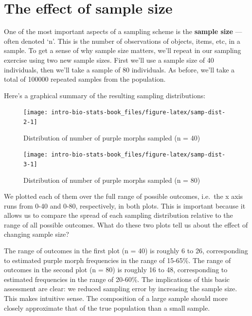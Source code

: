\documentclass[
]{book}
\begin{document}
\hypertarget{the-effect-of-sample-size}{%
\section{The effect of sample size}\label{the-effect-of-sample-size}}

One of the most important aspects of a sampling scheme is the \textbf{sample size} ---often denoted `n'. This is the number of observations of objects, items, etc, in a sample. To get a sense of why sample size matters, we'll repeat in our sampling exercise using two new sample sizes. First we'll use a sample size of 40 individuals, then we'll take a sample of 80 individuals. As before, we'll take a total of 100000 repeated samples from the population.

Here's a graphical summary of the resulting sampling distributions:

\begin{figure}

{\centering \texttt{[image: intro-bio-stats-book\_files/figure-latex/samp-dist-2-1]} 

}

\caption{Distribution of number of purple morphs sampled (n = 40)}\label{fig:samp-dist-2}
\end{figure}

\begin{figure}

{\centering \texttt{[image: intro-bio-stats-book\_files/figure-latex/samp-dist-3-1]} 

}

\caption{Distribution of number of purple morphs sampled (n = 80)}\label{fig:samp-dist-3}
\end{figure}

We plotted each of them over the full range of possible outcomes, i.e.~the x axis runs from 0-40 and 0-80, respectively, in both plots. This is important because it allows us to compare the spread of each sampling distribution relative to the range of all possible outcomes. What do these two plots tell us about the effect of changing sample size?

The range of outcomes in the first plot (n = 40) is roughly 6 to 26, corresponding to estimated purple morph frequencies in the range of 15-65\%. The range of outcomes in the second plot (n = 80) is roughly 16 to 48, corresponding to estimated frequencies in the range of 20-60\%. The implications of this basic assessment are clear: we reduced sampling error by increasing the sample size. This makes intuitive sense. The composition of a large sample should more closely approximate that of the true population than a small sample.
\end{document}
